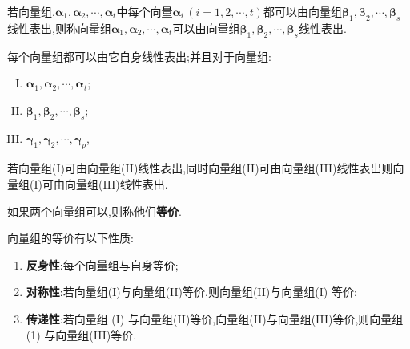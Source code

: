 \documentclass[9pt,a4paper]{book}
\begin{document}
\begin{defination}
	若向量组,$ \bm{\alpha}_1,\bm{\alpha}_2,\cdots,\bm{\alpha}_t $中每个向量$ \bm{\alpha}_i\, (i=1,2,\cdots,t) $都可以由向量组$ \bm{\beta}_1,\bm{\beta}_2,\cdots,\bm{\beta}_s $线性表出,则称向量组$ \bm{\alpha}_1,\bm{\alpha}_2,\cdots,\bm{\alpha}_t $可以由向量组$ \bm{\beta}_1,\bm{\beta}_2,\cdots,\bm{\beta}_s $线性表出.
\end{defination}
\begin{theorem}
	每个向量组都可以由它自身线性表出;并且对于向量组:
	\begin{enumerate}[(I)]
	\item \centering$ \bm{\alpha}_1,\bm{\alpha}_2,\cdots,\bm{\alpha}_t $;\\[7pt]
	\item \centering$ \bm{\beta}_1,\bm{\beta}_2,\cdots,\bm{\beta}_s $;\\[7pt]
	\item \centering$ \bm{\gamma}_1,\bm{\gamma}_2,\cdots,\bm{\gamma}_p $,
	\end{enumerate}
若向量组(I)可由向量组(II)线性表出,同时向量组(II)可由向量组(III)线性表出则向量组(I)可由向量组(III)线性表出.
\end{theorem}
\begin{defination}[向量组的等价]
	如果两个向量组可以,则称他们\textbf{等价}.
\end{defination}
\begin{feature}[向量组等价的性质]
	向量组的等价有以下性质:
	\begin{enumerate}
	\item \textbf{反身性}:每个向量组与自身等价;
	\item \textbf{对称性}:若向量组(I)与向量组(II)等价,则向量组(II)与向量组(I) 等价;
	\item \textbf{传递性}:若向量组 (I) 与向量组(II)等价,向量组(II)与向量组(III)等价,则向量组 (1) 与向量组(III)等价.
	\end{enumerate}
\end{feature}
\end{document}
